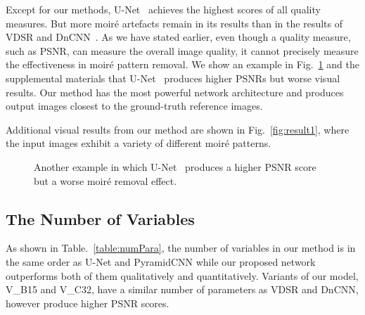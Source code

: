 \documentclass[journal]{IEEEtran}
\begin{document}
Except for our methods, U-Net~\cite{ronneberger2015u} achieves the highest scores of all quality measures. But more moir\'{e} artefacts remain in its results than in the results of VDSR\cite{kim2016accurate} and DnCNN~\cite{zhang2017beyond}. As we have stated earlier, even though a quality measure, such as PSNR, can measure the overall image quality, it cannot precisely measure the effectiveness in moir\'{e} pattern removal.
We show an example in Fig.~\ref{fig:anotherUnetExample} and the supplemental materials that U-Net~\cite{ronneberger2015u} produces higher PSNRs but worse visual results. Our method has the most powerful network architecture and produces output images closest to the ground-truth reference images.

Additional visual results from our method are shown in Fig.~\ref{fig:result1}, where the input images exhibit a variety of different moir\'{e} patterns.


\begin{figure}[t]
\begin{center}
\end{center}

\caption{Another example in which U-Net~\cite{ronneberger2015u} produces a higher PSNR score but a worse moir\'{e} removal effect. }
\label{fig:anotherUnetExample}
\end{figure}


\subsection{The Number of Variables}
As shown in Table.~\ref{table:numPara}, the number of variables in our method is in the same order as U-Net and PyramidCNN while our proposed network outperforms both of them qualitatively and quantitatively. Variants of our model, V\_B15 and V\_C32, have a similar number of parameters as VDSR and DnCNN, however produce higher PSNR scores.


\begin{table}[thb!]
\centering
\caption{The number of variables in learning based approaches ().}
\label{table:numPara}
\end{table}
\end{document}
